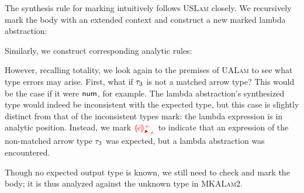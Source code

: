 The synthesis rule for marking intuitively follows \textsc{USLam} closely. We recursively
mark the body with an extended context and construct a new marked lambda
abstraction:
%
\begin{mathpar}

\end{mathpar}
%
Similarly, we construct corresponding analytic rules:
%
\begin{mathpar}

\end{mathpar}

However, recalling totality, we look again to the premises of \textsc{UALam} to see what type errors
may arise. First, what if $\TMV_3$ is not a matched arrow type? This would be the case if it were
$\TNum$, for example. The lambda abstraction's synthesized type would indeed be inconsistent with
the expected type, but this case is slightly distinct from that of the inconsistent types mark: the
lambda expression is in analytic position. Instead, we mark $\ECAnaNonMatchedArrow{\ECMV}$ to
indicate that an expression of the non-matched arrow type $\TMV_3$ was expected, but a lambda
abstraction was encountered.
%
\begin{mathpar}

\end{mathpar}
%
Though no expected output type is known, we still need to check and mark the body; it is thus
analyzed against the unknown type in \textsc{MKALam2}.

